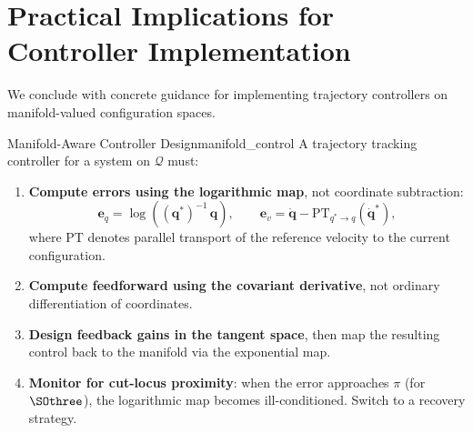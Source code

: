 \documentclass[12pt, openany]{book}
\theoremstyle{plain}
\newcommand{\configspace}{\mathcal{Q}}
\begin{document}
\section{Practical Implications for Controller Implementation}

We conclude with concrete guidance for implementing trajectory controllers
on manifold-valued configuration spaces.

\begin{principle}{Manifold-Aware Controller Design}{manifold_control}
  A trajectory tracking controller for a system on $\configspace$ must:
  \begin{enumerate}[label=(\roman*)]
    \item \textbf{Compute errors using the logarithmic map}, not coordinate
      subtraction:
      \begin{equation}
        \bm{e}_q = \log\!\left((\bm{q}^*)^{-1}\, \bm{q}\right), \qquad
        \bm{e}_v = \dot{\bm{q}} - \mathrm{PT}_{q^* \to q}(\dot{\bm{q}}^*),
      \end{equation}
      where $\mathrm{PT}$ denotes parallel transport of the reference velocity
      to the current configuration.
    \item \textbf{Compute feedforward using the covariant derivative}, not
      ordinary differentiation of coordinates.
    \item \textbf{Design feedback gains in the tangent space}, then map the
      resulting control back to the manifold via the exponential map.
    \item \textbf{Monitor for cut-locus proximity}: when the error approaches
      $\pi$ (for $\SOthree$), the logarithmic map becomes ill-conditioned.
      Switch to a recovery strategy.
  \end{enumerate}
\end{principle}
\end{document}
